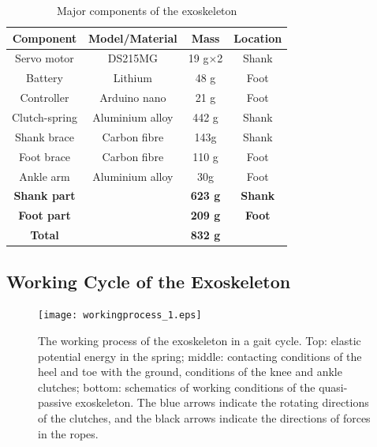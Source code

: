 \documentclass[10pt]{asme2ej}
\begin{document}
\begin{table}[t]
	\caption{Major components of the exoskeleton}
	\begin{center}
		\label{tab:hardware}
		\begin{tabular}{c c c c}	
			\hline
			\textbf{Component} & \textbf{Model/Material} & \textbf{Mass} & \textbf{Location} \\
			\hline
			Servo motor & DS215MG & 19 g$\times$2 & Shank\\
			Battery & Lithium & 48 g & Foot\\
			Controller & Arduino nano & 21 g & Foot\\
			Clutch-spring & Aluminium alloy & 442 g & Shank\\
			Shank brace & Carbon fibre & 143g & Shank\\
			Foot brace & Carbon fibre & 110 g & Foot\\
			Ankle arm & Aluminium alloy & 30g & Foot\\			
			\hline 
			\textbf{Shank part} & & \textbf{623 g} & \textbf{Shank}\\
			\textbf{Foot part} & & \textbf{209 g} & \textbf{Foot}\\
			\hline
			\textbf{Total} & & \textbf{832 g} & \\
			\hline
		\end{tabular}
	\end{center}
\end{table}


\subsection{Working Cycle of the Exoskeleton}
\label{subsec:Working process}

\begin{figure}[tb]
	\centering
	\texttt{[image: workingprocess\_1.eps]}
	\caption{The working process of the exoskeleton in a gait cycle.
	Top: elastic potential energy in the spring; middle: contacting conditions of the heel and toe with the ground, conditions of the knee and ankle clutches; bottom: schematics of working conditions of the quasi-passive exoskeleton.
	The blue arrows indicate the rotating directions of the clutches, and the black arrows indicate the directions of forces in the ropes.}
	\label{fig:workprocess}   
\end{figure}
\end{document}
